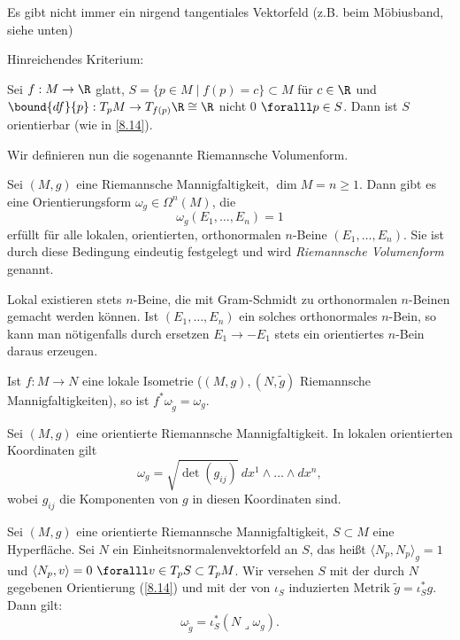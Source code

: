 \begin{rem*}
	Es gibt nicht immer ein nirgend tangentiales Vektorfeld (z.B. beim Möbiusband, siehe unten)
\end{rem*}

\noindent Hinreichendes Kriterium:

\begin{lem}
	Sei \( f:M \to \R \) glatt, \( S = \{p \in M \mid f(p) = c\} \subset M \) für $c \in \R$ und \( \bound{df}{p}: T_pM \to T_{f(p)}\R \cong \R \) nicht 0 $\foralll p \in S$. Dann ist $S$ orientierbar (wie in \ref{8.14}).
\end{lem}

\noindent Wir definieren nun die sogenannte Riemannsche Volumenform.

\begin{lem}\autolabel
	Sei \( (M,g) \) eine Riemannsche Mannigfaltigkeit, $\dim M = n \geq 1$. Dann gibt es eine Orientierungsform \( \omega_g \in \Omega^n(M) \), die
	\[ \omega_g(E_1, \dotsc,E_n) = 1 \]
	erfüllt für alle lokalen, orientierten, orthonormalen $n$-Beine \( (E_1,\dotsc,E_n) \). Sie ist durch diese Bedingung eindeutig festgelegt und wird \emph{Riemannsche Volumenform} genannt.
\end{lem}

\begin{rem*}
	Lokal existieren stets $n$-Beine, die mit Gram-Schmidt zu orthonormalen $n$-Beinen gemacht werden können. Ist \( (E_1,\dotsc,E_n) \) ein solches orthonormales $n$-Bein, so kann man nötigenfalls durch ersetzen \( E_1 \to -E_1 \) stets ein orientiertes $n$-Bein daraus erzeugen.
\end{rem*}

\begin{rem*}
	Ist \( f: M \to N \) eine lokale Isometrie (\( (M,g),(N,\tilde{g}) \) Riemannsche Mannigfaltigkeiten), so ist \( f^*\omega_{\tilde{g}} = \omega_g \).
\end{rem*}

\begin{lem}\autolabel
	Sei \( (M,g) \) eine orientierte Riemannsche Mannigfaltigkeit. In lokalen orientierten Koordinaten gilt
	\[ \omega_g = \sqrt{\det(g_{ij})}\ dx^1 \wedge \dots \wedge dx^n, \]
	wobei $g_{ij}$ die Komponenten von $g$ in diesen Koordinaten sind.
\end{lem}

\begin{lem}\autolabel
	Sei \( (M,g) \) eine orientierte Riemannsche Mannigfaltigkeit, \( S \subset M \) eine Hyperfläche. Sei $N$ ein Einheitsnormalenvektorfeld an $S$, das heißt \( \langle N_p,N_p \rangle_g = 1 \) und \( \langle N_p,v \rangle = 0 \ \foralll v \in T_pS \subset T_pM \). Wir versehen $S$ mit der durch $N$ gegebenen Orientierung (\ref{8.14}) und mit der von \( \iota_S \) induzierten Metrik \( \tilde{g} = \iota_S^*g \). Dann gilt:
	\[ \omega_{\tilde{g}} = \iota_S^*(N \lrcorner \omega_g). \]
\end{lem}